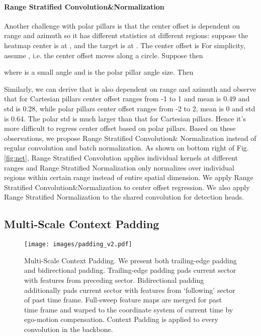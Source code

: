 \documentclass{article}
\begin{document}
\vspace{-3.5mm}\paragraph{Range Stratified Convolution\&Normalization}\label{stratum}
Another challenge with polar pillars is that the center offset is dependent on range and azimuth so it has different statistics at different regions: suppose the heatmap center is at , and the target is at . The center offset is 
\vspace{-1mm}\vspace{-2mm}
For simplicity, assume , i.e. the center offset moves along a circle. Suppose  then 

where  is a small angle and  is the polar pillar angle size. Then 

Similarly, we can derive that  is also dependent on range and azimuth and observe that for Cartesian pillars center offset ranges from -1 to 1 and mean is 0.49 and std is 0.28, while polar pillars center offset ranges from -2 to 2, mean is 0 and std is 0.64. The polar std is much larger than that for Cartesian pillars. Hence it's more difficult to regress center offset based on polar pillars. Based on these observations, we propose Range Stratified Convolution\& Normalization instead of regular convolution and batch normalization\cite{ioffe2015batch}. As shown on bottom right of Fig.\ref{fig:net}, Range Stratified Convolution applies individual kernels at different ranges and Range Stratified Normalization only normalizes over individual regions within certain range instead of entire spatial dimension. We apply Range Stratified Convolution\&Normalization to center offset regression. We also apply Range Stratified Normalization to the shared convolution for detection heads.
\vspace{-2mm}\subsection{Multi-Scale Context Padding}\label{sec:padding}
 \begin{figure}
  \centering 
\texttt{[image: images/padding\_v2.pdf]}\vspace{-2mm}
  \caption{Multi-Scale Context Padding. We present both trailing-edge padding and bidirectional padding. Trailing-edge padding pads current sector with features from preceding sector. Bidirectional padding additionally pads current sector with features from `following' sector of past time frame. Full-sweep feature maps are merged for past time frame and warped to the coordinate system of current time by ego-motion compensation. Context Padding is applied to every convolution in the backbone.}\label{fig:padding}
\end{figure}
\end{document}
